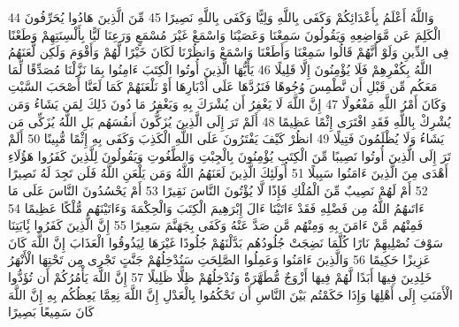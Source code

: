 {\tiny\colorbox{cl_aya}{44}} وَاللَّهُ أَعْلَمُ بِأَعْدَائِكُمْ وَكَفَى بِاللَّهِ وَلِيًّا وَكَفَى بِاللَّهِ نَصِيرًا
{\tiny\colorbox{cl_aya}{45}} مِّنَ الَّذِينَ هَادُوا يُحَرِّفُونَ الْكَلِمَ عَن مَّوَاضِعِهِ وَيَقُولُونَ سَمِعْنَا وَعَصَيْنَا وَاسْمَعْ غَيْرَ مُسْمَعٍ وَرَعِنَا لَيًّا بِأَلْسِنَتِهِمْ وَطَعْنًا فِى الدِّينِ وَلَوْ أَنَّهُمْ قَالُوا سَمِعْنَا وَأَطَعْنَا وَاسْمَعْ وَانظُرْنَا لَكَانَ خَيْرًا لَّهُمْ وَأَقْوَمَ وَلَكِن لَّعَنَهُمُ اللَّهُ بِكُفْرِهِمْ فَلَا يُؤْمِنُونَ إِلَّا قَلِيلًا
{\tiny\colorbox{cl_aya}{46}} يَأَيُّهَا الَّذِينَ أُوتُوا الْكِتَبَ ءَامِنُوا بِمَا نَزَّلْنَا مُصَدِّقًا لِّمَا مَعَكُم مِّن قَبْلِ أَن نَّطْمِسَ وُجُوهًا فَنَرُدَّهَا عَلَى أَدْبَارِهَا أَوْ نَلْعَنَهُمْ كَمَا لَعَنَّا أَصْحَبَ السَّبْتِ وَكَانَ أَمْرُ اللَّهِ مَفْعُولًا
{\tiny\colorbox{cl_aya}{47}} إِنَّ اللَّهَ لَا يَغْفِرُ أَن يُشْرَكَ بِهِ وَيَغْفِرُ مَا دُونَ ذَلِكَ لِمَن يَشَاءُ وَمَن يُشْرِكْ بِاللَّهِ فَقَدِ افْتَرَى إِثْمًا عَظِيمًا
{\tiny\colorbox{cl_aya}{48}} أَلَمْ تَرَ إِلَى الَّذِينَ يُزَكُّونَ أَنفُسَهُم بَلِ اللَّهُ يُزَكِّى مَن يَشَاءُ وَلَا يُظْلَمُونَ فَتِيلًا
{\tiny\colorbox{cl_aya}{49}} انظُرْ كَيْفَ يَفْتَرُونَ عَلَى اللَّهِ الْكَذِبَ وَكَفَى بِهِ إِثْمًا مُّبِينًا
{\tiny\colorbox{cl_aya}{50}} أَلَمْ تَرَ إِلَى الَّذِينَ أُوتُوا نَصِيبًا مِّنَ الْكِتَبِ يُؤْمِنُونَ بِالْجِبْتِ وَالطَّغُوتِ وَيَقُولُونَ لِلَّذِينَ كَفَرُوا هَؤُلَاءِ أَهْدَى مِنَ الَّذِينَ ءَامَنُوا سَبِيلًا
{\tiny\colorbox{cl_aya}{51}} أُولَئِكَ الَّذِينَ لَعَنَهُمُ اللَّهُ وَمَن يَلْعَنِ اللَّهُ فَلَن تَجِدَ لَهُ نَصِيرًا
{\tiny\colorbox{cl_aya}{52}} أَمْ لَهُمْ نَصِيبٌ مِّنَ الْمُلْكِ فَإِذًا لَّا يُؤْتُونَ النَّاسَ نَقِيرًا
{\tiny\colorbox{cl_aya}{53}} أَمْ يَحْسُدُونَ النَّاسَ عَلَى مَا ءَاتَىهُمُ اللَّهُ مِن فَضْلِهِ فَقَدْ ءَاتَيْنَا ءَالَ إِبْرَهِيمَ الْكِتَبَ وَالْحِكْمَةَ وَءَاتَيْنَهُم مُّلْكًا عَظِيمًا
{\tiny\colorbox{cl_aya}{54}} فَمِنْهُم مَّنْ ءَامَنَ بِهِ وَمِنْهُم مَّن صَدَّ عَنْهُ وَكَفَى بِجَهَنَّمَ سَعِيرًا
{\tiny\colorbox{cl_aya}{55}} إِنَّ الَّذِينَ كَفَرُوا بَِٔايَتِنَا سَوْفَ نُصْلِيهِمْ نَارًا كُلَّمَا نَضِجَتْ جُلُودُهُم بَدَّلْنَهُمْ جُلُودًا غَيْرَهَا لِيَذُوقُوا الْعَذَابَ إِنَّ اللَّهَ كَانَ عَزِيزًا حَكِيمًا
{\tiny\colorbox{cl_aya}{56}} وَالَّذِينَ ءَامَنُوا وَعَمِلُوا الصَّلِحَتِ سَنُدْخِلُهُمْ جَنَّتٍ تَجْرِى مِن تَحْتِهَا الْأَنْهَرُ خَلِدِينَ فِيهَا أَبَدًا لَّهُمْ فِيهَا أَزْوَجٌ مُّطَهَّرَةٌ وَنُدْخِلُهُمْ ظِلًّا ظَلِيلًا
{\tiny\colorbox{cl_aya}{57}} إِنَّ اللَّهَ يَأْمُرُكُمْ أَن تُؤَدُّوا الْأَمَنَتِ إِلَى أَهْلِهَا وَإِذَا حَكَمْتُم بَيْنَ النَّاسِ أَن تَحْكُمُوا بِالْعَدْلِ إِنَّ اللَّهَ نِعِمَّا يَعِظُكُم بِهِ إِنَّ اللَّهَ كَانَ سَمِيعًا بَصِيرًا
